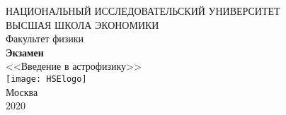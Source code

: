 \documentclass[a4paper, 12pt]{article}
\begin{document}
	\begin{titlepage}
		\begin{center}
			$$$$
			$$$$
			$$$$
			$$$$
			{\Large{НАЦИОНАЛЬНЫЙ ИССЛЕДОВАТЕЛЬСКИЙ УНИВЕРСИТЕТ}}\\
			\vspace{0.1cm}
			{\Large{ВЫСШАЯ ШКОЛА ЭКОНОМИКИ}}\\
			\vspace{0.25cm}
			{\large{Факультет физики}}\\
			\vspace{5.5cm}
			{\Huge\textbf{{Экзамен}}}\\%
			\vspace{1cm}
			{\LARGE{<<Введение в астрофизику>>}}\\%
			\vspace{2cm}
			\vfill
			\texttt{[image: HSElogo]}\\
			\vfill
			Москва\\
			2020
		\end{center}
	\end{titlepage}
	
	\tableofcontents
	
	\newpage
	
	
	
	\newpage
	
	
	
	\newpage
	
	
	
	\newpage
	
	
	
	\newpage
	
	
	
	\newpage
	
	
	
	\newpage
	
	
	
	\newpage
	
	
	
	\newpage
	
	
	
	\newpage
	
	
	
	\newpage
	
	
	
	\newpage
	
\end{document}
